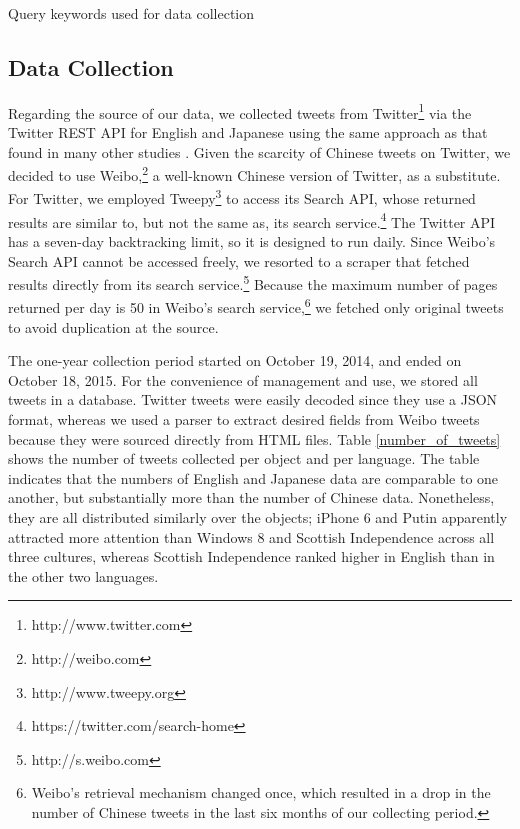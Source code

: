 \documentclass[english]{jnlp_1.4}
\begin{document}
\begin{table}[b]
\caption{Query keywords used for data collection}
\label{query_keywords}

\vspace{-0.5\Cvs}
\end{table}


\subsection{Data Collection}

Regarding the source of our data, we collected tweets from Twitter\footnote{http://www.twitter.com} via the Twitter REST API for English and Japanese using the same approach as that found in many other studies \cite{Nakov13}. Given the scarcity of Chinese tweets on Twitter, we decided to use Weibo,\footnote{http://weibo.com} a well-known Chinese version of Twitter, as a substitute. For Twitter, we employed Tweepy\footnote{http://www.tweepy.org} to access its Search API, whose returned results are similar to, but not the same as, its search service.\footnote{https://twitter.com/search-home} The Twitter API has a seven-day backtracking limit, so it is designed to run daily. Since Weibo's Search API cannot be accessed freely, we resorted to a scraper that fetched results directly from its search service.\footnote{http://s.weibo.com} Because the maximum number of pages returned per day is 50 in Weibo's search service,\footnote{Weibo's retrieval mechanism changed once, which resulted in a drop in the number of Chinese tweets in the last six months of our collecting period.} we fetched only original tweets to avoid duplication at the source.

The one-year collection period started on October 19, 2014, and ended on October 18, 2015. For the convenience of management and use, we stored all tweets in a database. Twitter tweets were easily decoded since they use a JSON format, whereas we used a parser to extract desired fields from Weibo tweets because they were sourced directly from HTML files. Table \ref{number_of_tweets} shows the number of tweets collected per object and per language. The table indicates that the numbers of English and Japanese data are comparable to one another, but substantially more than the number of Chinese data. Nonetheless, they are all distributed similarly over the objects; iPhone 6 and Putin apparently attracted more attention than Windows 8 and Scottish Independence across all three cultures, whereas Scottish Independence ranked higher in English than in the other two languages.
\end{document}
